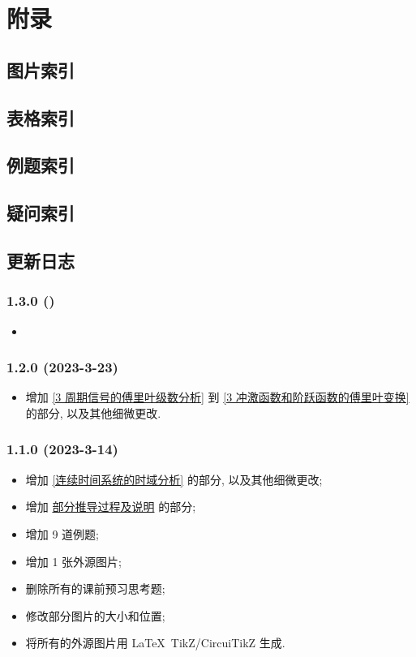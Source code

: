 \section{附录} \label{附录}
\subsection{图片索引} \label{图片索引}
\makeatletter
{}
\makeatother

\subsection{表格索引} \label{表格索引}
\makeatletter
{}
\makeatother

\subsection{例题索引} \label{例题索引}
\listofexampleprobs

\subsection{疑问索引} \label{疑问索引}
\listofquestions

\subsection{更新日志} \label{更新日志}
\subsubsection*{1.3.0 ()}
\begin{itemize}
    \item
\end{itemize}

\subsubsection*{1.2.0 (2023-3-23)}
\begin{itemize}
    \item 增加 \ref{3 周期信号的傅里叶级数分析} 到 \ref{3 冲激函数和阶跃函数的傅里叶变换} 的部分, 以及其他细微更改.
\end{itemize}

\subsubsection*{1.1.0 (2023-3-14)}
\begin{itemize}
    \item 增加 \ref{连续时间系统的时域分析} 的部分, 以及其他细微更改;
    \item 增加 \hyperref[部分推导过程及说明]{部分推导过程及说明} 的部分;
    \item 增加 9 道例题;
    \item 增加 1 张外源图片;
    \item 删除所有的课前预习思考题;
    \item 修改部分图片的大小和位置;
    \item 将所有的外源图片用 \LaTeX\ TikZ/CircuiTikZ 生成.
\end{itemize}

